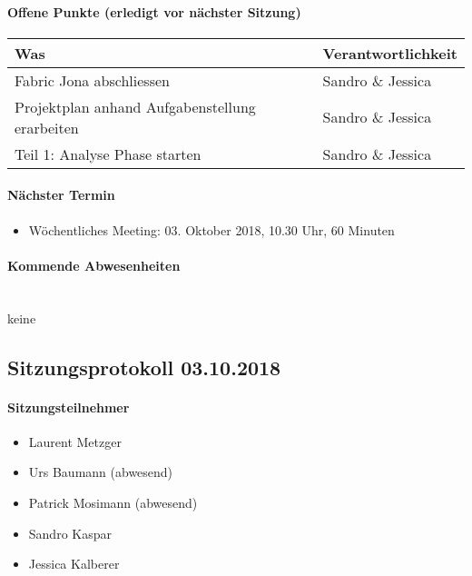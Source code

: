 \paragraph{Offene Punkte (erledigt vor nächster Sitzung)} \mbox{}
\begin{table}[H]
	\centering
	\begin{tabularx}{\textwidth}{X | p{4.5cm}}
		\rowcolor{gray!50}
		\textbf{Was} & \textbf{Verantwortlichkeit} \\
		\hline	
		Fabric Jona abschliessen & Sandro \& Jessica \\
		Projektplan anhand Aufgabenstellung erarbeiten & Sandro \& Jessica \\
		Teil 1: Analyse Phase starten & Sandro \& Jessica \\
	\end{tabularx}
	\label{tab:my-label}
\end{table}

\paragraph{Nächster Termin}
\begin{itemize}	
	\item Wöchentliches Meeting: 03. Oktober 2018, 10.30 Uhr, 60 Minuten
\end{itemize}

\paragraph{Kommende Abwesenheiten} \mbox{}\\
keine

\newpage





\subsection{Sitzungsprotokoll 03.10.2018}

\paragraph{Sitzungsteilnehmer}
\begin{itemize}	
	\item Laurent Metzger 
	\item Urs Baumann (abwesend)
	\item Patrick Mosimann (abwesend)
	\item Sandro Kaspar
	\item Jessica Kalberer
\end{itemize}

